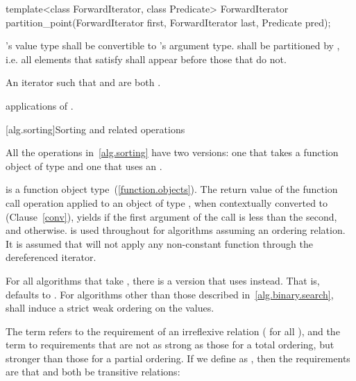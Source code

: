 %
\begin{itemdecl}
template<class ForwardIterator, class Predicate>
  ForwardIterator partition_point(ForwardIterator first,
                                  ForwardIterator last,
                                  Predicate pred);
\end{itemdecl}


\begin{itemdescr}
\pnum
\requires {}'s value type shall be convertible to 's argument type.  shall be partitioned by , i.e. all elements that satisfy  shall appear before those that do not.

\pnum
\returns An iterator  such that  and  are both .

\pnum
\complexity {} applications of .
\end{itemdescr}


[alg.sorting]{Sorting and related operations}

\pnum
All the operations in~\ref{alg.sorting} have two versions: one that takes a function object of type
and one that uses an
.

\pnum
{}
is a function object
type~(\ref{function.objects}). The return value of the function call operation applied to
an object of type , when contextually converted to
 (Clause~\ref{conv}),
yields  if the first argument of the call
is less than the second, and
otherwise.
is used throughout for algorithms assuming an ordering relation.
It is assumed that
will not apply any non-constant function through the dereferenced iterator.

\pnum
For all algorithms that take
,
there is a version that uses
instead.
That is,
defaults to
.
For algorithms other than those described in~\ref{alg.binary.search},
 shall induce a strict weak ordering on the values.

\pnum
The term
refers to the
requirement of an irreflexive relation ( for all ),
and the term
to requirements that are not as strong as
those for a total ordering,
but stronger than those for a partial
ordering.
If we define
as
,
then the requirements are that
and
both be transitive  relations:

